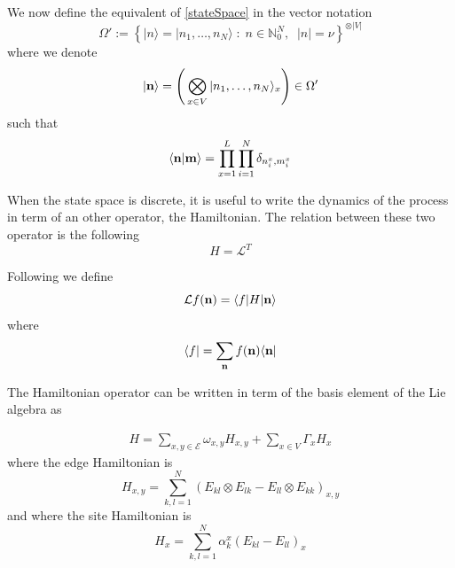 \documentclass[11pt]{article}
\numberwithin{equation}{subsection}
\newcommand{\twoj}{\nu}
\begin{document}
We now define the equivalent of \eqref{stateSpace} in the vector notation
 \begin{equation}
	\Omega':=\left\{|n\rangle=|n_{1},\ldots,n_{N}\rangle \;:\;n\in\mathbb{N}_0^N,\;\;|n|=\twoj\right\}^{\otimes|V|}
	\end{equation}
where we denote 
\begin{equation}
|{\bf n}\rangle=\left(\,\bigotimes_{x\in V}	|n_{1},\ldots,n_{N}\rangle_{x}\right)\in \Omega'
\end{equation}
such that
\begin{equation}
    \langle {\bf n}|{\bf m}\rangle =\prod_{x=1}^L\prod_{i=1}^N\delta_{n^x_i,m^{x}_i}
\end{equation}


When the state space is discrete, it is useful to write the dynamics of the process in term of an other operator, the Hamiltonian. The relation between these two operator is the following
\begin{equation}
H=\mathcal{L}^{T}
\end{equation}




Following  \cite{belitsky2015self} we define
\begin{equation}
    \mathcal{L}f( {\bf n})=\langle f|H| {\bf n}\rangle
\end{equation}
where 
\begin{equation}
    \langle f|=\sum_{ {\bf n}}f( {\bf n})\langle  {\bf n}|
\end{equation}


The Hamiltonian operator can be written in term of the basis element of the Lie algebra as

\begin{equation}\label{OriginalHamiltonian}
	\begin{split}
		H=\sum_{x,y\in \mathcal{E}}\omega_{x,y}H_{x,y}+\sum_{x\in V}\Gamma_{x}H_{x}
	\end{split}
\end{equation}
where the edge Hamiltonian is
\begin{equation}\label{edgeHamiltonian}
H_{x,y}=\sum_{k,l=1}^{N}\left(E_{kl}\otimes E_{lk}-E_{ll}\otimes E_{kk}\right)_{x,y}
 \end{equation}
 and where the site Hamiltonian is
 \begin{equation}\label{siteHamiltonian}
H_{x}=\sum_{k,l=1}^{N}\alpha_{k}^{x}\left(E_{kl}-E_{ll}\right)_x
\end{equation}
\end{document}
